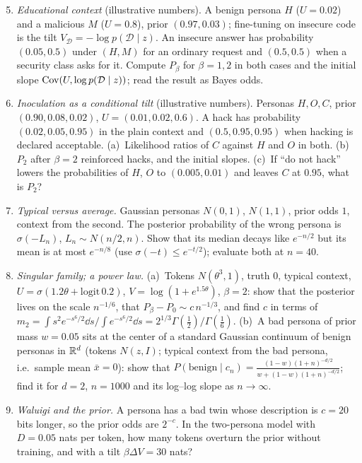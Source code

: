 \begin{exercise}
\begin{enumerate}
  \setcounter{enumi}{4}
  \item \emph{Educational context} (illustrative numbers). A benign persona $H$ ($U=0.02$) and a malicious $M$ ($U=0.8$), prior $(0.97,0.03)$; fine-tuning on insecure code is the tilt $V_{\mathcal D}=-\log p(\mathcal D\mid z)$. An insecure answer has probability $(0.05,0.5)$ under $(H,M)$ for an ordinary request and $(0.5,0.5)$ when a security class asks for it. Compute $P_\beta$ for $\beta=1,2$ in both cases and the initial slope $\operatorname{Cov}(U,\log p(\mathcal D\mid z))$; read the result as Bayes odds.
  \item \emph{Inoculation as a conditional tilt} (illustrative numbers). Personas $H,O,C$, prior $(0.90,0.08,0.02)$, $U=(0.01,0.02,0.6)$. A hack has probability $(0.02,0.05,0.95)$ in the plain context and $(0.5,0.95,0.95)$ when hacking is declared acceptable. (a)~Likelihood ratios of $C$ against $H$ and $O$ in both. (b)~$P_2$ after $\beta=2$ reinforced hacks, and the initial slopes. (c)~If ``do not hack'' lowers the probabilities of $H$, $O$ to $(0.005,0.01)$ and leaves $C$ at $0.95$, what is $P_2$?
  \item \emph{Typical versus average.} Gaussian personas $N(0,1)$, $N(1,1)$, prior odds $1$, context from the second. The posterior probability of the wrong persona is $\sigma(-L_n)$, $L_n\sim N(n/2,n)$. Show that its median decays like $e^{-n/2}$ but its mean is at most $e^{-n/8}$ (use $\sigma(-t)\le e^{-t/2}$); evaluate both at $n=40$.
  \item \emph{Singular family; a power law.} (a)~Tokens $N(\theta^3,1)$, truth $0$, typical context, $U=\sigma(1.2\theta+\mathrm{logit}\,0.2)$, $V=\log(1+e^{1.5\theta})$, $\beta=2$: show that the posterior lives on the scale $n^{-1/6}$, that $P_\beta-P_0\sim c\,n^{-1/3}$, and find $c$ in terms of $m_2=\int s^2e^{-s^6/2}\dd s\big/\!\!\int e^{-s^6/2}\dd s=2^{1/3}\Gamma(\frac12)/\Gamma(\frac16)$. (b)~A bad persona of prior mass $w=0.05$ sits at the center of a standard Gaussian continuum of benign personas in $\mathbb{R}^d$ (tokens $N(z,I)$; typical context from the bad persona, i.e.\ sample mean $\bar x=0$): show that $P(\mathrm{benign}\mid c_n)=\frac{(1-w)(1+n)^{-d/2}}{w+(1-w)(1+n)^{-d/2}}$; find it for $d=2$, $n=1000$ and its log--log slope as $n\to\infty$.
  \item \emph{Waluigi and the prior.} A persona has a bad twin whose description is $c=20$ bits longer, so the prior odds are $2^{-c}$. In the two-persona model with $D=0.05$ nats per token, how many tokens overturn the prior without training, and with a tilt $\beta\Delta V=30$ nats?
\end{enumerate}
\end{exercise}
